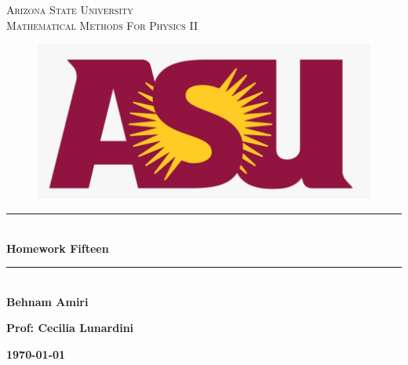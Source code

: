 \documentclass[fleqn]{article}
\begin{document}
  \begin{titlepage}

    \newcommand{\HRule}{\rule{\linewidth}{0.5mm}}

    \center



    \textsc{\LARGE Arizona State University}\\[1.5cm]

    \textsc{\LARGE Mathematical Methods For Physics II }\\[1.5cm]


    \begin{figure}
      \includegraphics[width=\linewidth]{asu.png}
    \end{figure}


    \HRule \\[0.4cm]
    { \huge \bfseries Homework Fifteen}\\[0.4cm] 
    \HRule \\[1.5cm]

    \textbf{Behnam Amiri}

    \bigbreak

    \textbf{Prof: Cecilia Lunardini}

    \bigbreak


    \textbf{{\large \today}\\[2cm]}

    \vfill

  \end{titlepage}
\end{document}
